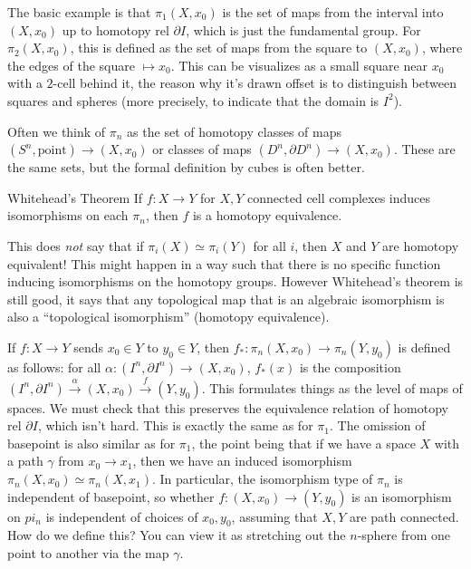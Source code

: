 \begin{example}
    The basic example is that $\pi_1(X,x_0)$ is the set of maps from the interval into $(X,x_0)$ up to homotopy rel $\partial I$, which is just the fundamental group. For $\pi_2(X,x_0)$, this is defined as the set of maps from the square to $(X,x_0)$, where the edges of the square $\mapsto x_0$. This can be visualizes as a small square near $x_0$ with a $2$-cell behind it, the reason why it's drawn offset is to distinguish between squares and spheres (more precisely, to indicate that the domain is $I^2$).
\end{example}
Often we think of $\pi_n $ as the set of homotopy classes of maps $(S^n ,\text{point} )\to (X,x_0)$ or classes of maps $(D^n ,\partial D^n )\to (X,x_0)$. These are the same sets, but the formal definition by cubes is often better.
\begin{namedthm}{Whitehead's Theorem}
    If $f\colon X \to Y$ for $X,Y$ connected cell complexes induces isomorphisms on each $\pi_n $, then $f$ is a homotopy equivalence.
\end{namedthm}
\begin{note}
    This does \emph{not} say that if $\pi_i (X)\simeq \pi_i (Y)$ for all $i$, then $X$ and $Y$ are homotopy equivalent! This might happen in a way such that there is no specific function inducing isomorphisms on the homotopy groups. However Whitehead's theorem is still good, it says that any topological map that is an algebraic isomorphism is also a ``topological isomorphism'' (homotopy equivalence).
\end{note}
If $f\colon X \to Y$ sends $x_0\in Y$ to $y_0\in Y$, then $f_* \colon \pi_n (X,x_0) \to \pi_n (Y,y_0)$ is defined as follows: for all $\alpha \colon (I^n ,\partial I^n )\to (X,x_0) $, $f_*(x)$ is the composition $(I^n ,\partial I^n )\overset{\alpha }{\longrightarrow} (X,x_0)\overset{f}{\longrightarrow} (Y,y_0)$. This formulates things as the level of maps of spaces. We must check that this preserves the equivalence relation of homotopy rel $\partial I$, which isn't hard. This is exactly the same as for $\pi_1$. The omission of basepoint is also similar as for $\pi_1$, the point being that if we have a space $X$ with a path $\gamma$ from $x_0\to x_1$, then we have an induced isomorphism $\pi_n (X,x_0)\simeq \pi_n (X,x_1)$. In particular, the isomorphism type of $\pi_n $ is independent of basepoint, so whether $f\colon (X,x_0) \to (Y,y_0)$ is an isomorphism on $pi_n $ is independent of choices of $x_0,y_0$, assuming that $X,Y$ are path connected. How do we define this? You can view it as stretching out the $n$-sphere from one point to another via the map $\gamma$.
